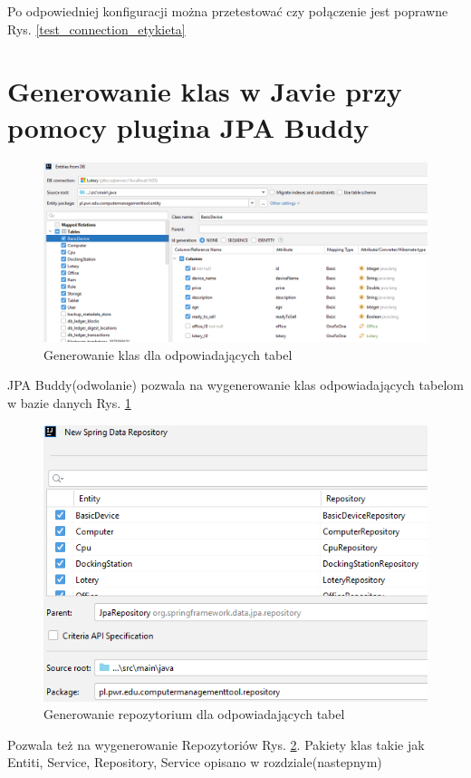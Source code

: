 Po odpowiedniej konfiguracji można przetestować czy połączenie jest poprawne Rys. \ref{test_connection_etykieta}
\newpage

\section{Generowanie klas w Javie przy pomocy plugina JPA Buddy}

 
\begin{figure}[h]
		\centering
    \includegraphics[scale=0.5]{rys05/generate_entities.png}
    \caption{Generowanie klas dla odpowiadających tabel}
    \label{entities_etykieta}
\end{figure}

JPA Buddy(odwolanie) pozwala na wygenerowanie klas odpowiadających tabelom w bazie danych Rys. \ref{entities_etykieta}

\begin{figure}[h]
		\centering
    \includegraphics[scale=0.6]{rys05/generate_repository.png}
    \caption{Generowanie repozytorium dla odpowiadających tabel}
    \label{repository_etykieta}
\end{figure}

Pozwala też na wygenerowanie Repozytoriów Rys. \ref{repository_etykieta}. Pakiety klas takie jak Entiti, Service, Repository, Service opisano w rozdziale(nastepnym)



















